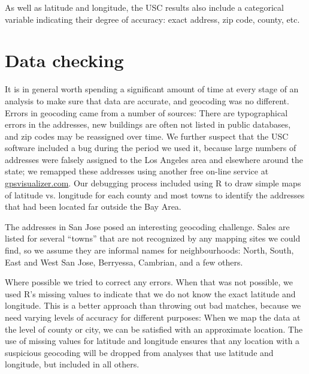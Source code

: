 \documentclass[oneside]{article}
\begin{document}
As well as latitude and longitude, the USC results also include a categorical variable indicating their degree of accuracy: exact address, zip code, county, etc.



\section{Data checking}

It is in general worth spending a significant amount of time at every stage of an analysis to make sure that data are accurate, and geocoding was no different.  Errors in geocoding came from a number of sources:  There are typographical errors in the addresses, new buildings are often not listed in public databases, and zip codes may be reassigned over time.  We further suspect that the USC software included a bug during the period we used it, because large numbers of addresses were falsely assigned to the Los Angeles area and elsewhere around the state; we remapped these addresses using another free on-line service at \url{gpsvisualizer.com}. Our debugging process included using R to draw simple maps of latitude vs. longitude for each county and most towns to identify the addresses that had been located far outside the Bay Area.

The addresses in San Jose posed an interesting geocoding challenge.  Sales are listed for several ``towns'' that are not recognized by any mapping sites we could find, so we assume they are informal names for neighbourhoods: North, South, East and West San Jose, Berryessa, Cambrian, and a few others.  


Where possible we tried to correct any errors.  When that was not possible, we used R's missing values to indicate that we do not know the exact latitude and longitude.  This is a better approach than throwing out bad matches, because we need varying levels of accuracy for different  purposes: When we map the data at the level of county or city, we can be satisfied with an approximate location.  The use of missing values for latitude and longitude ensures that any location with a suspicious geocoding will be dropped from analyses that use latitude and longitude, but included in all others.
\end{document}
